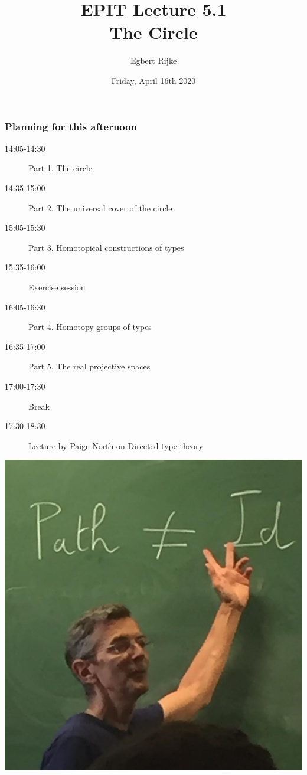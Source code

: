 \documentclass[handout]{beamer}
\title{EPIT Lecture 5.1\\ The Circle}
\author{Egbert Rijke}
\date{Friday, April 16th 2020}
\begin{document}
\begin{frame}
  \maketitle
\end{frame}

\begin{frame}
  \frametitle{Planning for this afternoon}
  \begin{description}
  \item[14:05-14:30] Part 1. The circle
  \item[14:35-15:00] Part 2. The universal cover of the circle
  \item[15:05-15:30] Part 3. Homotopical constructions of types
  \item[15:35-16:00] Exercise session
  \item[16:05-16:30] Part 4. Homotopy groups of types
  \item[16:35-17:00] Part 5. The real projective spaces
  \item[17:00-17:30] Break
  \item[17:30-18:30] Lecture by Paige North on Directed type theory
  \end{description}
\end{frame}

\begin{frame}[plain]
  \begin{center}
    \includegraphics[width=.6\paperwidth]{thierry}
  \end{center}
\end{frame}
\end{document}
